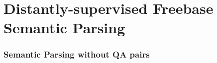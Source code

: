 \documentclass[mathserif,12pt]{beamer}
\begin{document}
\section{Distantly-supervised Freebase Semantic Parsing}

\begin{frame}
\frametitle{Semantic Parsing without QA pairs}
\vspace{-1em}
\begin{columns}
  \begin{column}{0.05\textwidth}
  \end{column}
 \begin{column}{0.55\textwidth}
 \end{column}


\end{columns}
\end{frame}
\end{document}
